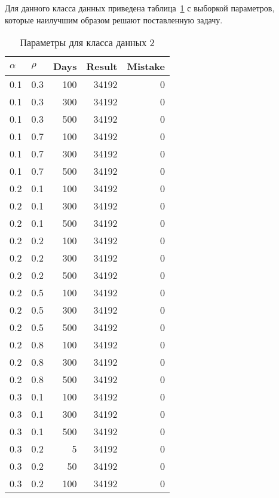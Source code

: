 Для данного класса данных приведена таблица~\ref{tbl:cls2} с выборкой параметров, которые наилучшим образом решают поставленную задачу.

\begin{center}
	\captionsetup{justification=raggedright,singlelinecheck=off}
	\begin{longtable}[c]{|r|r|r|r|r|}
		\caption{Параметры для класса данных 2 \label{tbl:cls2}}\\ \hline
		\multicolumn{1}{|l|}{$\alpha$} &
		\multicolumn{1}{l|}{$\rho$} & 
		\multicolumn{1}{l|}{Days} & 
		\multicolumn{1}{l|}{Result} & 
		\multicolumn{1}{l|}{Mistake} \\ \hline
		0.1 &  0.3 &  100 & 34192 &     0 \\
		0.1 &  0.3 &  300 & 34192 &     0 \\
		0.1 &  0.3 &  500 & 34192 &     0 \\ \hline
		0.1 &  0.7 &  100 & 34192 &     0 \\
		0.1 &  0.7 &  300 & 34192 &     0 \\
		0.1 &  0.7 &  500 & 34192 &     0 \\ \hline
		0.2 &  0.1 &  100 & 34192 &     0 \\
		0.2 &  0.1 &  300 & 34192 &     0 \\
		0.2 &  0.1 &  500 & 34192 &     0 \\ \hline
		0.2 &  0.2 &  100 & 34192 &     0 \\
		0.2 &  0.2 &  300 & 34192 &     0 \\
		0.2 &  0.2 &  500 & 34192 &     0 \\ \hline
		0.2 &  0.5 &  100 & 34192 &     0 \\
		0.2 &  0.5 &  300 & 34192 &     0 \\
		0.2 &  0.5 &  500 & 34192 &     0 \\ \hline
		0.2 &  0.8 &  100 & 34192 &     0 \\
		0.2 &  0.8 &  300 & 34192 &     0 \\
		0.2 &  0.8 &  500 & 34192 &     0 \\ \hline
		0.3 &  0.1 &  100 & 34192 &     0 \\
		0.3 &  0.1 &  300 & 34192 &     0 \\
		0.3 &  0.1 &  500 & 34192 &     0 \\ \hline
		0.3 &  0.2 &    5 & 34192 &     0 \\
		0.3 &  0.2 &   50 & 34192 &     0 \\
		0.3 &  0.2 &  100 & 34192 &     0 \\

\end{longtable}
\end{center}
